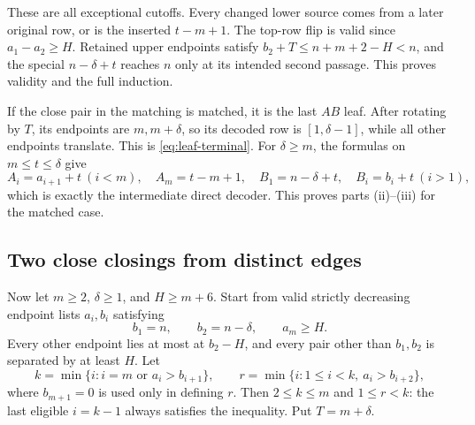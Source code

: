 These are all exceptional cutoffs. Every changed lower source comes from a later original row, or is the inserted $t-m+1$. The top-row flip is valid since $a_1-a_2\ge H$. Retained upper endpoints satisfy $b_2+T\le n+m+2-H<n$, and the special $n-\delta+t$ reaches $n$ only at its intended second passage. This proves validity and the full induction.

If the close pair in the matching is matched, it is the last $AB$ leaf. After rotating by $T$, its endpoints are $m,m+\delta$, so its decoded row is $[1,\delta-1]$, while all other endpoints translate. This is \eqref{eq:leaf-terminal}. For $\delta\ge m$, the formulas on $m\le t\le\delta$ give
\[
 A_i=a_{i+1}+t\ (i<m),\quad A_m=t-m+1,\quad
 B_1=n-\delta+t,\quad B_i=b_i+t\ (i>1),
\]
which is exactly the intermediate direct decoder. This proves parts (ii)--(iii) for the matched case.

\subsection{Two close closings from distinct edges}\label{app:distinct}
Now let $m\ge2$, $\delta\ge1$, and $H\ge m+6$. Start from valid strictly decreasing endpoint lists $a_i,b_i$ satisfying
\[
 b_1=n,\qquad b_2=n-\delta,\qquad a_m\ge H.
\]
Every other endpoint lies at most at $b_2-H$, and every pair other than $b_1,b_2$ is separated by at least $H$. Let
\[
 k=\min\{i:i=m\text{ or }a_i>b_{i+1}\},\qquad
 r=\min\{i:1\le i<k,\ a_i>b_{i+2}\},
\]
where $b_{m+1}=0$ is used only in defining $r$. Then $2\le k\le m$ and $1\le r<k$: the last eligible $i=k-1$ always satisfies the inequality. Put $T=m+\delta$.

